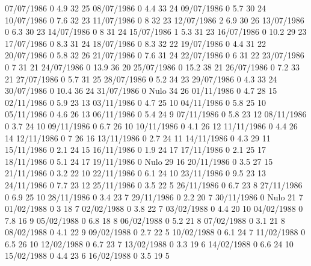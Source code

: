 07/07/1986  0      4.9    32     25 
08/07/1986  0      4.4    33     24 
09/07/1986  0      5.7    30     24 
10/07/1986  0      7.6    32     23 
11/07/1986  0      8      32     23 
12/07/1986  2      6.9    30     26 
13/07/1986  0      6.3    30     23 
14/07/1986  0      8      31     24 
15/07/1986  1      5.3    31     23 
16/07/1986  0      10.2   29     23 
17/07/1986  0      8.3    31     24 
18/07/1986  0      8.3    32     22 
19/07/1986  0      4.4    31     22 
20/07/1986  0      5.8    32     26 
21/07/1986  0      7.6    31     24 
22/07/1986  0      6      31     22 
23/07/1986  0      7      31     21 
24/07/1986  0      13.9   36     20 
25/07/1986  0      15.2   38     21 
26/07/1986  0      7.2    33     21 
27/07/1986  0      5.7    31     25 
28/07/1986  0      5.2    34     23 
29/07/1986  0      4.3    33     24 
30/07/1986  0      10.4   36     24 
31/07/1986  0     Nulo    34     26 
01/11/1986  0      4.7    28     15 
02/11/1986  0      5.9    23     13 
03/11/1986  0      4.7    25     10 
04/11/1986  0      5.8    25     10 
05/11/1986  0      4.6    26     13 
06/11/1986  0      5.4    24     9 
07/11/1986  0      5.8    23     12 
08/11/1986  0      3.7    24     10 
09/11/1986  0      6.7    26     10 
10/11/1986  0      4.1    26     12 
11/11/1986  0      4.4    26     14 
12/11/1986  0      7      26     16 
13/11/1986  0      2.7    24     11 
14/11/1986  0      4.3    29     11 
15/11/1986  0      2.1    24     15 
16/11/1986  0      1.9    24     17 
17/11/1986  0      2.1    25     17 
18/11/1986  0      5.1    24     17 
19/11/1986  0     Nulo    29     16 
20/11/1986  0      3.5    27     15 
21/11/1986  0      3.2    22     10 
22/11/1986  0      6.1    24     10 
23/11/1986  0      9.5    23     13 
24/11/1986  0      7.7    23     12 
25/11/1986  0      3.5    22     5 
26/11/1986  0      6.7    23     8 
27/11/1986  0      6.9    25     10 
28/11/1986  0      3.4    23     7 
29/11/1986  0      2.2    20     7 
30/11/1986  0     Nulo    21     7 
01/02/1988  0      3      18     7 
02/02/1988  0      3.8    22     7 
03/02/1988  0      4.4    20     10 
04/02/1988  0      7.8    16     9 
05/02/1988  0      6.8    18     8 
06/02/1988  0      5.2    21     8 
07/02/1988  0      3.1    21     8 
08/02/1988  0      4.1    22     9 
09/02/1988  0      2.7    22     5 
10/02/1988  0      6.1    24     7 
11/02/1988  0      6.5    26     10 
12/02/1988  0      6.7    23     7 
13/02/1988  0      3.3    19     6 
14/02/1988  0      6.6    24     10 
15/02/1988  0      4.4    23     6 
16/02/1988  0      3.5    19     5 
